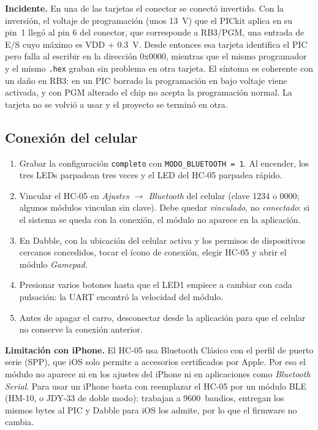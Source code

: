 \noindent\textbf{Incidente.} En una de las tarjetas el conector se conectó
invertido. Con la inversión, el voltaje de programación (unos
\SI{13}{\volt}) que el PICkit aplica en su pin~1 llegó al pin 6 del conector,
que corresponde a RB3/PGM, una entrada de E/S cuyo máximo es VDD +
\SI{0.3}{\volt}. Desde entonces esa tarjeta identifica el PIC pero falla al
escribir en la dirección 0x0000, mientras que el mismo programador y el mismo
\texttt{.hex} graban sin problema en otra tarjeta. El síntoma es coherente con
un daño en RB3: en un PIC borrado la programación en bajo voltaje viene
activada, y con PGM alterado el chip no acepta la programación normal. La
tarjeta no se volvió a usar y el proyecto se terminó en otra.

\subsection{Conexión del celular}

\begin{enumerate}
  \item Grabar la configuración \texttt{completo} con \texttt{MODO\_BLUETOOTH
        = 1}. Al encender, los tres LEDs parpadean tres veces y el LED del
        HC-05 parpadea rápido.
  \item Vincular el HC-05 en \emph{Ajustes $\rightarrow$ Bluetooth} del
        celular (clave 1234 o 0000; algunos módulos vinculan sin clave). Debe
        quedar \emph{vinculado}, no \emph{conectado}: si el sistema se queda
        con la conexión, el módulo no aparece en la aplicación.
  \item En Dabble, con la ubicación del celular activa y los permisos de
        dispositivos cercanos concedidos, tocar el ícono de conexión, elegir
        HC-05 y abrir el módulo \emph{Gamepad}.
  \item Presionar varios botones hasta que el LED1 empiece a cambiar con cada
        pulsación: la UART encontró la velocidad del módulo.
  \item Antes de apagar el carro, desconectar desde la aplicación para que el
        celular no conserve la conexión anterior.
\end{enumerate}

\noindent\textbf{Limitación con iPhone.} El HC-05 usa Bluetooth Clásico con el
perfil de puerto serie (SPP), que iOS solo permite a accesorios certificados
por Apple. Por eso el módulo no aparece ni en los ajustes del iPhone ni en
aplicaciones como \emph{Bluetooth Serial}. Para usar un iPhone basta con
reemplazar el HC-05 por un módulo BLE (HM-10, o JDY-33 de doble modo): trabajan
a 9600~baudios, entregan los mismos bytes al PIC y Dabble para iOS los admite,
por lo que el firmware no cambia.
